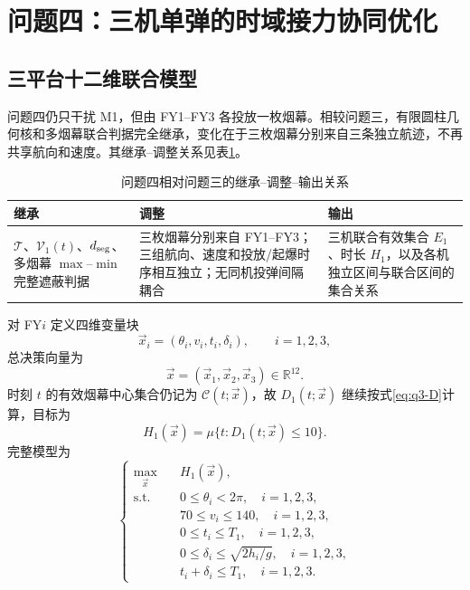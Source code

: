 \section{问题四：三机单弹的时域接力协同优化}

\subsection{三平台十二维联合模型}
问题四仍只干扰 M1，但由 FY1--FY3 各投放一枚烟幕。相较问题三，有限圆柱几何核和多烟幕联合判据完全继承，变化在于三枚烟幕分别来自三条独立航迹，不再共享航向和速度。其继承--调整关系见表\ref{tab:q4-inherit}。

\begin{table}[tbp]
\centering
\caption{问题四相对问题三的继承--调整--输出关系}
\label{tab:q4-inherit}
\small
\begin{tabularx}{\textwidth}{p{} X X}
\toprule
\textbf{继承} & \textbf{调整} & \textbf{输出} \\
\midrule
$\mathcal T$、$\mathcal V_1(t)$、$d_{\rm seg}$、多烟幕 $\max$--$\min$ 完整遮蔽判据 & 三枚烟幕分别来自 FY1--FY3；三组航向、速度和投放/起爆时序相互独立；无同机投弹间隔耦合 & 三机联合有效集合 $E_1$、时长 $H_1$，以及各机独立区间与联合区间的集合关系 \\
\bottomrule
\end{tabularx}
\end{table}

对 FY$i$ 定义四维变量块
\begin{equation}
\vec x_i=(\theta_i,v_i,t_i,\delta_i),\qquad i=1,2,3,
\end{equation}
总决策向量为
\begin{equation}
\vec x=(\vec x_1,\vec x_2,\vec x_3)\in\mathbb R^{12}.
\label{eq:q4-x}
\end{equation}
时刻 $t$ 的有效烟幕中心集合仍记为 $\mathcal C(t;\vec x)$，故 $D_1(t;\vec x)$ 继续按式\eqref{eq:q3-D}计算，目标为
\[
H_1(\vec x)=\mu\{t:D_1(t;\vec x)\le10\}.
\]
完整模型为
\begin{equation}
\left\{
\begin{aligned}
\max_{\vec x}\quad &H_1(\vec x),\\
\text{s.t.}\quad
&0\le\theta_i<2\pi,\quad i=1,2,3,\\
&70\le v_i\le140,\quad i=1,2,3,\\
&0\le t_i\le T_1,\quad i=1,2,3,\\
&0\le\delta_i\le\sqrt{2h_i/g},\quad i=1,2,3,\\
&t_i+\delta_i\le T_1,\quad i=1,2,3.
\end{aligned}
\right.
\label{eq:q4-model}
\end{equation}

